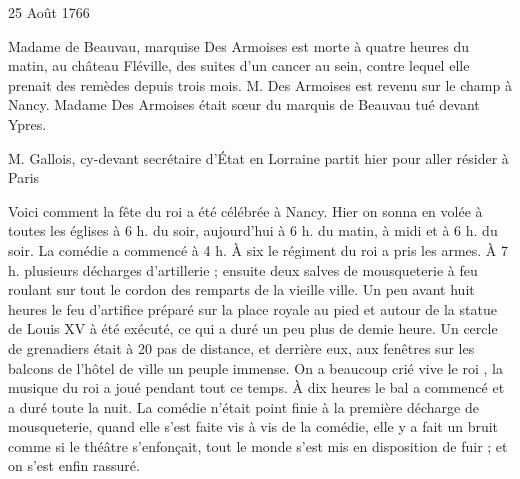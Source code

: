                      \begin{diary}{25 Août 1766}{}


                           Madame
                               de Beauvau, marquise
                              Des Armoises est morte à quatre heures
                           du matin, au château
                              Fléville, des suites
                           d'un cancer au sein, contre lequel elle prenait
                           des remèdes depuis trois mois. M.
                              Des Armoises
                           est revenu sur le champ à Nancy.
                              Madame
                                 Des Armoises était sœur du marquis de
                              Beauvau tué devant Ypres. \bigskip



                           M. Gallois, cy-devant
                           secrétaire d’État en Lorraine
                           partit
                           hier pour aller résider à Paris
                        \bigskip


                         Voici comment la fête du
                           roi a été célébrée
                           à Nancy. Hier on sonna en volée
                           à toutes les
                           églises à 6 h. du soir, aujourd'hui à 6 h.
                           du matin, à midi et
                           à 6 h. du soir. La comédie a commencé à 4 h.
                           À six le régiment du roi a pris les armes. À 7 h.
                           plusieurs décharges d'artillerie ; ensuite deux
                           salves de mousqueterie à feu roulant sur tout
                           le cordon des remparts de la vieille ville. Un peu
                           avant huit heures le feu d'artifice préparé
                           sur la place royale au pied et autour de la
                           statue de Louis XV à été exécuté, ce qui a
                           duré un peu plus de demie heure. Un
                           cercle de grenadiers était à 20 pas de
                           distance, et derrière eux, aux fenêtres
                           sur les balcons de l'hôtel de
                              ville un
                           peuple
                           immense. On a beaucoup crié \og vive le roi \fg{},
                           la musique du roi a joué
                           pendant tout
                           ce temps. À dix heures le bal a commencé et a duré toute la nuit. La comédie
                           n'était
                           point finie à la première décharge de
                           mousqueterie, quand elle s'est faite vis
                           à vis de la comédie, elle y a fait un bruit
                           comme si le théâtre s'enfonçait, tout le monde
                           s'est mis en disposition de fuir ; et on s'est
                           enfin rassuré. \bigskip


                     \end{diary}

